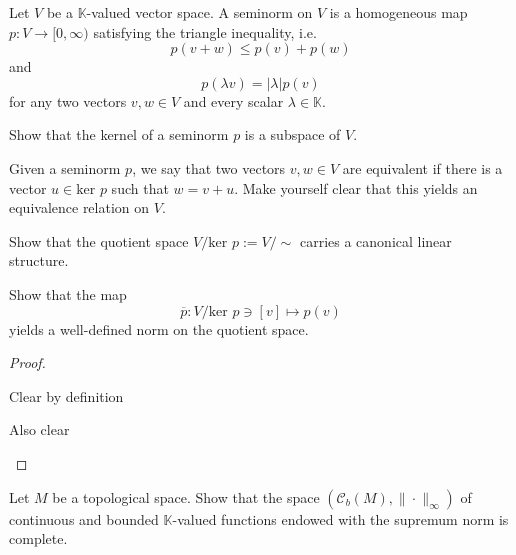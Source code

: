 \begin{Problem}
	Let $V$ be a $\mathbb{K}$-valued vector space. A seminorm on $V$ is a homogeneous map $p:V\to [0,\infty)$ satisfying the triangle inequality, i.e.
	\[
	p(v+w)\le p(v)+p(w)
\]
and
\[
p(\lambda v)=|\lambda|p(v)
\]
for any two vectors $v,w\in V$ and every scalar $\lambda\in\mathbb{K}$.
\begin{parts}
	\item Show that the kernel of a seminorm $p$ is a subspace of $V$.

		Given a seminorm $p$, we say that two vectors $v,w\in V$ are equivalent if there is a vector $u\in \text{ker }p$ such that $w=v+u$. Make yourself clear that this yields an equivalence relation on $V$.
	\item Show that the quotient space $V / \text{ker }p:=V / \sim$ carries a canonical linear structure.
	\item Show that the map
		\[
			\overline{p}:V / \text{ker }p\ni [v]\mapsto p(v)
		\]
		yields a well-defined norm on the quotient space.
\end{parts}
\end{Problem}
\begin{proof}
	\begin{parts}
	\item Clear by definition
	\item Also clear
	\end{parts}
\end{proof}
\begin{Problem}\label{pr:funcanalblatt3-2}
	Let $M$ be a topological space. Show that the space $(\mathcal{C}_b(M), \|\cdot\|_\infty)$ of continuous and bounded $\mathbb{K}$-valued functions endowed with the supremum norm is complete.
\end{Problem}

